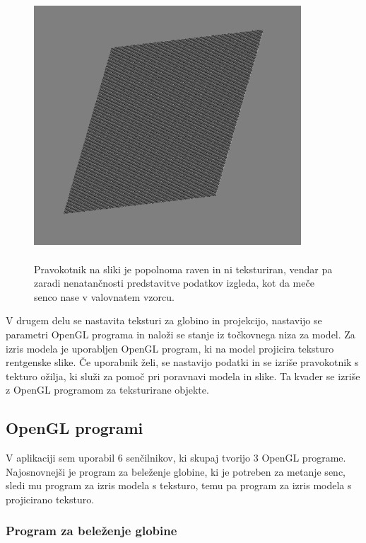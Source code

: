 \documentclass[a4paper, 12pt]{book}
\begin{document}
\begin{figure}[h!]
\begin{center}
\includegraphics[width=10cm, height=10cm, keepaspectratio=true]{Rendering_artifact.png}
\end{center}
\caption{Pravokotnik na sliki je popolnoma raven in ni teksturiran, vendar pa zaradi nenatančnosti predstavitve podatkov izgleda, kot da meče senco nase v valovnatem vzorcu.}
\label{renderingartifact}
\end{figure}

V drugem delu se nastavita teksturi za globino in projekcijo, nastavijo se parametri OpenGL programa in naloži se stanje iz točkovnega niza za model. Za izris modela je uporabljen OpenGL program, ki na model projicira teksturo rentgenske slike. Če uporabnik želi, se nastavijo podatki in se izriše pravokotnik s tekturo ožilja, ki služi za pomoč pri poravnavi modela in slike. Ta kvader se izriše z OpenGL programom za teksturirane objekte.

\subsection{OpenGL programi}

V aplikaciji sem uporabil 6 senčilnikov, ki skupaj tvorijo 3 OpenGL programe. Najosnovnejši je program za beleženje globine, ki je potreben za metanje senc, sledi mu program za izris modela s teksturo, temu pa program za izris modela s projicirano teksturo.

\subsubsection*{Program za beleženje globine}
\end{document}
